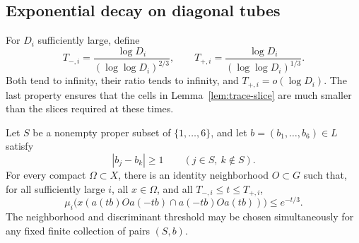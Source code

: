 \subsection{Exponential decay on diagonal tubes}

For $D_i$ sufficiently large, define
\begin{equation}
 T_{-,i}=\frac{\log D_i}{(\log\log D_i)^{2/3}},\qquad
 T_{+,i}=\frac{\log D_i}{(\log\log D_i)^{1/3}}.
                                                        \label{eq:time-range}
\end{equation}
Both tend to infinity, their ratio tends to infinity, and
$T_{+,i}=o(\log D_i)$.  The last property ensures that the cells in
Lemma~\ref{lem:trace-slice} are much smaller than the slices required
at these times.

\begin{proposition}\label{prop:bowen}
Let $S$ be a nonempty proper subset of $\{1,\ldots,6\}$, and let
$b=(b_1,\ldots,b_6)\in L$ satisfy
\[
 |b_j-b_k|\ge1\qquad(j\in S,\ k\notin S).
\]
For every compact $\Omega\subset X$, there is an identity
neighborhood $O\subset G$ such that, for all sufficiently large
$i$, all $x\in\Omega$, and all $T_{-,i}\le t\le T_{+,i}$,
\begin{equation}
 \mu_i\bigl(x(a(tb)Oa(-tb)\cap a(-tb)Oa(tb))\bigr)
       \le e^{-t/3}.                              \label{eq:bowen-bound}
\end{equation}
The neighborhood and discriminant threshold may be chosen
simultaneously for any fixed finite collection of pairs $(S,b)$.
\end{proposition}

